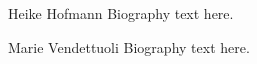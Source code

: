 \begin{IEEEbiography}{Heike Hofmann}
Biography text here.
\end{IEEEbiography}

\begin{IEEEbiography}{Marie Vendettuoli}
Biography text here.
\end{IEEEbiography}

%
%






